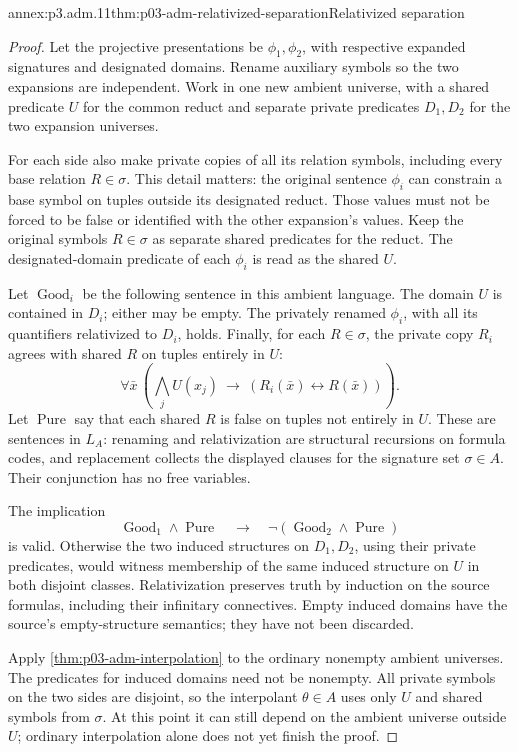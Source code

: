 \begin{annexitem}{annex:p3.adm.11}{thm:p03-adm-relativized-separation}{Relativized separation}
\begin{proof}
Let the projective presentations be \(\phi_1,\phi_2\), with respective
expanded signatures and designated domains. Rename auxiliary symbols
so the two expansions are independent. Work in one new ambient universe,
with a shared predicate \(U\) for the common reduct and separate private
predicates \(D_1,D_2\) for the two expansion universes.

For each side also make private copies of all its relation symbols,
including every base relation \(R\in\sigma\). This detail matters:
the original sentence \(\phi_i\) can constrain a base symbol on tuples
outside its designated reduct. Those values must not be forced to be
false or identified with the other expansion's values. Keep the original
symbols \(R\in\sigma\) as separate shared predicates for the reduct.
The designated-domain predicate of each \(\phi_i\) is read as the
shared \(U\).

Let \(\operatorname{Good}_i\) be the following sentence in this ambient
language. The domain \(U\) is contained in \(D_i\); either may be empty.
The privately renamed \(\phi_i\), with all its quantifiers relativized
to \(D_i\), holds. Finally, for each \(R\in\sigma\), the private copy
\(R_i\) agrees with shared \(R\) on tuples entirely in \(U\):
\[
 \forall\bar x\,
 \left(\bigwedge_j U(x_j)\ \longrightarrow\
                   (R_i(\bar x)\leftrightarrow R(\bar x))\right).
\]
Let \(\operatorname{Pure}\) say that each shared \(R\) is false on
tuples not entirely in \(U\). These are sentences in \(L_A\): renaming
and relativization are structural recursions on formula codes, and
replacement collects the displayed clauses for the signature set
\(\sigma\in A\). Their conjunction has no free variables.

The implication
\[
 \operatorname{Good}_1\land\operatorname{Pure}
 \quad\longrightarrow\quad
 \neg(\operatorname{Good}_2\land\operatorname{Pure})
\]
is valid. Otherwise the two induced structures on \(D_1,D_2\), using
their private predicates, would witness membership of the same induced
structure on \(U\) in both disjoint classes. Relativization preserves
truth by induction on the source formulas, including their infinitary
connectives. Empty induced domains have the source's empty-structure
semantics; they have not been discarded.

Apply \cref{thm:p03-adm-interpolation} to the ordinary nonempty
ambient universes. The predicates for induced domains need not be
nonempty. All private symbols on the two
sides are disjoint, so the interpolant \(\theta\in A\) uses only
\(U\) and shared symbols from \(\sigma\). At this point it can still
depend on the ambient universe outside \(U\); ordinary interpolation
alone does not yet finish the proof.


\end{proof}
\end{annexitem}
